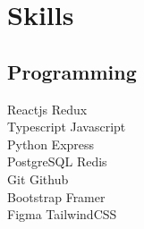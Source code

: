 \documentclass[]{deedy-resume-openfont}
\begin{document}
\begin{minipage}[t]{0.33\textwidth}




\section{Skills}
\subsection{Programming}
Reactjs \textbullet{}  Redux \\Typescript\textbullet{}  Javascript \\ Python \textbullet{} Express \\
PostgreSQL \textbullet{} Redis \\
Git \textbullet{} Github \\
Bootstrap \textbullet{} Framer \\ Figma \textbullet{} TailwindCSS
\sectionsep


\end{minipage}
\end{document}
